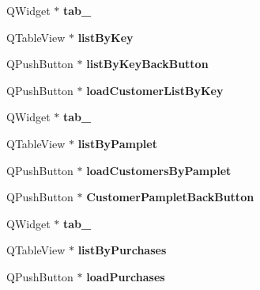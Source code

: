 \begin{DoxyCompactItemize}
Q\+Widget $\ast$ {\bfseries tab\+\_}
\item 
\mbox{\label{class_ui___main_window_ac749415835eaf1df54c1a2e027d6f592}} 
Q\+Table\+View $\ast$ {\bfseries list\+By\+Key}
\item 
\mbox{\label{class_ui___main_window_a82a114a7bf3b998f8ba3c97787ae8c8c}} 
Q\+Push\+Button $\ast$ {\bfseries list\+By\+Key\+Back\+Button}
\item 
\mbox{\label{class_ui___main_window_a6885739b60d4a420b5af0d190ed0eefc}} 
Q\+Push\+Button $\ast$ {\bfseries load\+Customer\+List\+By\+Key}
\item 
\mbox{\label{class_ui___main_window_a193f7d89d896d9369f4a1173de796fd1}} 
Q\+Widget $\ast$ {\bfseries tab\+\_}
\item 
\mbox{\label{class_ui___main_window_a2fed008c10561a916f877495338f75b9}} 
Q\+Table\+View $\ast$ {\bfseries list\+By\+Pamplet}
\item 
\mbox{\label{class_ui___main_window_a3b55887d7a82cd4c3c1e38c52de0f08b}} 
Q\+Push\+Button $\ast$ {\bfseries load\+Customers\+By\+Pamplet}
\item 
\mbox{\label{class_ui___main_window_a8269827b760348a11c02794baf52ab1c}} 
Q\+Push\+Button $\ast$ {\bfseries Customer\+Pamplet\+Back\+Button}
\item 
\mbox{\label{class_ui___main_window_a38d64a7676076a2b9a1781cbff687f58}} 
Q\+Widget $\ast$ {\bfseries tab\+\_}
\item 
\mbox{\label{class_ui___main_window_abc2c82167d9f919a7e8fa7edcc4e18e2}} 
Q\+Table\+View $\ast$ {\bfseries list\+By\+Purchases}
\item 
\mbox{\label{class_ui___main_window_a42bc0d5aaf6b36a0b9110238cb208c75}} 
Q\+Push\+Button $\ast$ {\bfseries load\+Purchases}
\item 
\mbox{\label{class_ui___main_window_a6fae9bd91586382bd236e53feca9e472}} 

\end{DoxyCompactItemize}
